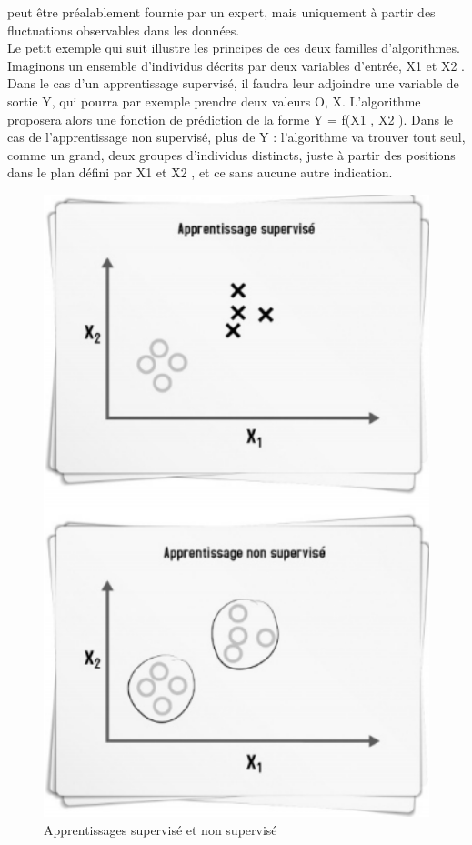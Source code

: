 \documentclass[11pt]{report}
\begin{document}
peut être préalablement fournie par un expert, mais uniquement à partir des fluctuations
observables dans les données.\\
Le petit exemple qui suit illustre les principes de ces deux familles d’algorithmes.
Imaginons un ensemble d’individus décrits par deux variables d’entrée, X1 et X2
.
 Dans le cas d’un apprentissage supervisé, il faudra leur adjoindre une variable de sortie Y, qui
pourra par exemple prendre deux valeurs {O, X}. L’algorithme proposera alors une
fonction de prédiction de la forme Y = f(X1
, X2
). Dans le cas de l’apprentissage non
supervisé, plus de Y : l’algorithme va trouver tout seul, comme un grand, deux groupes
d’individus distincts, juste à partir des positions dans le plan défini par X1 et X2
, et ce sans
aucune autre indication. 

\begin{figure}[H]
	\begin{center}
		\includegraphics[width=12cm]{images/supervised.png}
		\caption{ Apprentissages supervisé et non supervisé}
		\label{fig:figure}
	\end{center}
\end{figure}
\end{document}
